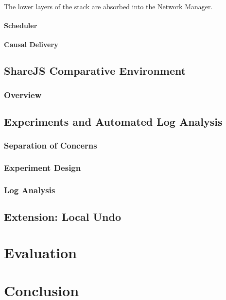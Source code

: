 \documentclass[12pt,a4paper,twoside,openright]{report}
\begin{document}
		 The lower layers of the stack are absorbed into the Network Manager.
		
		
		\subsubsection{Scheduler}
		
		\subsubsection{Causal Delivery}
	
\section{ShareJS Comparative Environment}

	\subsection{Overview}
	
\section{Experiments and Automated Log Analysis}

	\subsection{Separation of Concerns}
	
	\subsection{Experiment Design}
	
	\subsection{Log Analysis}
	
\section{Extension: Local Undo}


\chapter{Evaluation}


\chapter{Conclusion}
\end{document}
